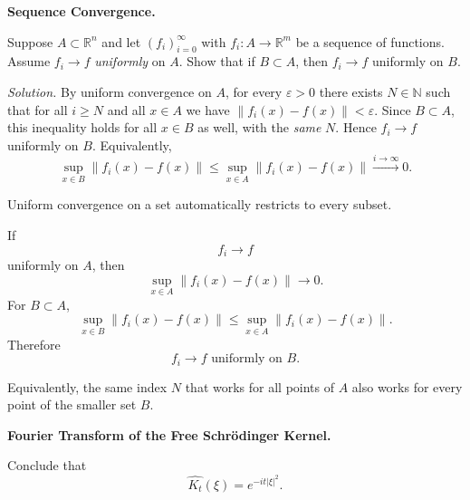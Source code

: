 \begin{problem}[CP-II-0239]
\label{prob:cp-ii-0239}
\textbf{Sequence Convergence.}

\hspace*{1.5em}Suppose $A\subset\mathbb{R}^n$ and let $(f_i)_{i=0}^\infty$ with $f_i:A\to\mathbb{R}^m$ be a sequence of functions.
Assume $f_i\to f$ \emph{uniformly} on $A$. Show that if $B\subset A$, then $f_i\to f$ uniformly on $B$.

\textit{Solution.} By uniform convergence on $A$, for every $\varepsilon>0$ there exists $N\in\mathbb{N}$ such that
for all $i\ge N$ and all $x\in A$ we have $\|f_i(x)-f(x)\|<\varepsilon$. Since $B\subset A$, this inequality holds
for all $x\in B$ as well, with the \emph{same} $N$. Hence $f_i\to f$ uniformly on $B$. Equivalently,
\[
\sup_{x\in B}\|f_i(x)-f(x)\|\le \sup_{x\in A}\|f_i(x)-f(x)\|\xrightarrow{i\to\infty} 0.
\]
\end{problem}

\begin{solution}
Uniform convergence on a set automatically restricts to every subset.

If
\[
f_i\to f
\]
uniformly on \(A\), then
\[
\sup_{x\in A}
\|f_i(x)-f(x)\|
\longrightarrow0.
\]
For \(B\subset A\),
\[
\sup_{x\in B}
\|f_i(x)-f(x)\|
\le
\sup_{x\in A}
\|f_i(x)-f(x)\|.
\]
Therefore
\[
\boxed{
f_i\to f
\text{ uniformly on }B.
}
\]

Equivalently, the same index \(N\) that works for all points of \(A\) also works for every
point of the smaller set \(B\).
\end{solution}


\begin{problem}[CP-II-0240]
\label{prob:cp-ii-0240}
\textbf{Fourier Transform of the Free Schrödinger Kernel.}

\hspace*{1.5em}Conclude that
		\[
		\widehat{K_t}(\xi) = e^{-it|\xi|^2}.
		\]
\end{problem}

